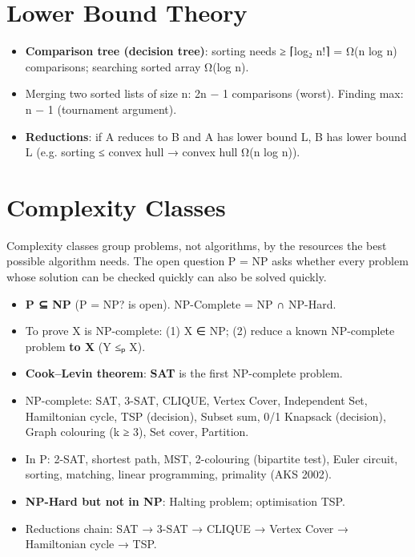 \needspace{95pt}

\hypertarget{p2-07--9-lower-bound-theory}{%
\section{Lower Bound Theory}\label{p2-07--9-lower-bound-theory}}

\begin{itemize}
\tightlist
\item
  \textbf{Comparison tree (decision tree)}: sorting needs ≥ ⌈log₂ n!⌉ = Ω(n log n) comparisons; searching sorted array Ω(log n).
\item
  Merging two sorted lists of size n: 2n − 1 comparisons (worst). Finding max: n − 1 (tournament argument).
\item
  \textbf{Reductions}: if A reduces to B and A has lower bound L, B has lower bound L (e.g. sorting ≤ convex hull → convex hull Ω(n log n)).
\end{itemize}

\needspace{125pt}

\hypertarget{p2-07--10-complexity-classes}{%
\section{Complexity Classes}\label{p2-07--10-complexity-classes}}

Complexity classes group problems, not algorithms, by the resources the best possible algorithm needs. The
open question P = NP asks whether every problem whose solution can be checked quickly can also be solved quickly.



\begin{itemize}
\tightlist
\item
  \textbf{P ⊆ NP} (P = NP? is open). NP-Complete = NP ∩ NP-Hard.
\item
  To prove X is NP-complete: (1) X ∈ NP; (2) reduce a known NP-complete problem \textbf{to X} (Y ≤ₚ X).
\item
  \textbf{Cook--Levin theorem}: \textbf{SAT} is the first NP-complete problem.
\item
  NP-complete: SAT, 3-SAT, CLIQUE, Vertex Cover, Independent Set, Hamiltonian cycle, TSP (decision), Subset sum, 0/1 Knapsack (decision), Graph colouring (k ≥ 3), Set cover, Partition.
\item
  In P: 2-SAT, shortest path, MST, 2-colouring (bipartite test), Euler circuit, sorting, matching, linear programming, primality (AKS 2002).
\item
  \textbf{NP-Hard but not in NP}: Halting problem; optimisation TSP.
\item
  Reductions chain: SAT → 3-SAT → CLIQUE → Vertex Cover → Hamiltonian cycle → TSP.
\end{itemize}

